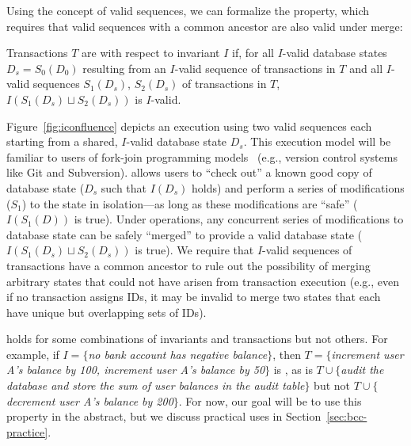 Using the concept of valid sequences, we can formalize the
\iconfluence property, which requires that valid sequences with a
common ancestor are also valid under merge:

\begin{definition}[\iconfluence]
Transactions $T$ are \iconfluent with respect to invariant $I$ if, for
all $I$-valid database states $D_s=S_0(D_0)$ resulting from an
$I$-valid sequence of transactions in $T$ and all $I$-valid sequences
$S_1(D_s)$, $S_2(D_s)$ of transactions in $T$, $I(S_1(D_s) \sqcup
S_2(D_s))$ is $I$-valid.
\end{definition}

Figure~\ref{fig:iconfluence} depicts an \iconfluent execution using
two valid sequences each starting from a shared, $I$-valid database
state $D_s$. This execution model will be familiar to users of
fork-join programming models~\cite{hewitt-forkjoin} (e.g., version
control systems like Git and Subversion). \iconfluence allows users to
``check out'' a known good copy of database state ($D_s$ such that
$I(D_s)$ holds) and perform a series of modifications ($S_1$) to the
state in isolation---as long as these modifications are ``safe''
($I(S_1(D))$ is true). Under \iconfluent operations, any concurrent
series of modifications to database state can be safely ``merged'' to
provide a valid database state ($I(S_1(D_s) \sqcup S_2(D_s))$ is
true). We require that $I$-valid sequences of transactions have a
common ancestor to rule out the possibility of merging arbitrary
states that could not have arisen from transaction execution (e.g.,
even if no transaction assigns IDs, it may be invalid to merge two
states that each have unique but overlapping sets of IDs).

\iconfluence holds for some combinations of invariants and
transactions but not others. For example, if $I=\{$\textit{no bank
  account has negative balance}$\}$, then $T=\{$\textit{increment user
  A's balance by 100, increment user A's balance by 50}$\}$ is
\iconfluent, as is $T\cup\{$\textit{audit the database and store the
  sum of user balances in the \textrm{audit} table}$\}$ but not
$T\cup\{$\textit{decrement user A's balance by 200}$\}$. For now, our
goal will be to use this property in the abstract, but we discuss
practical uses in Section~\ref{sec:bcc-practice}.

